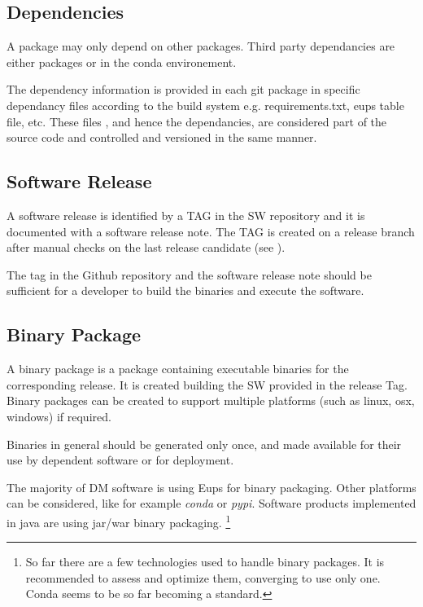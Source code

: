 \subsection{Dependencies} \label{sec:dependencies}


A package may only depend on other packages. Third party dependancies are either packages or in the conda environement.

The dependency information is provided in each git package in specific dependancy files  according to the build system e.g.  requirements.txt, eups table file, etc.
These files , and hence the dependancies,  are considered part of the source code and controlled  and versioned in the same manner.


\subsection{Software Release} \label{sec:swrel}

A software release is identified by a TAG in the SW repository and it is documented with a software release note.
The TAG is created on a release branch after manual checks on the last release candidate (see ).

The tag in the Github repository and the software release note should be sufficient for a developer
to build the binaries and execute the software.



\subsection{Binary Package} \label{sec:swbpkg}

A binary package is a package containing executable binaries for the corresponding release.
It is created building the SW provided in the release Tag.
Binary packages can be created to support multiple platforms (such as linux, osx, windows) if required.

Binaries in general should be generated only once, and made available for their use by dependent software or for deployment.

The majority of DM software is using Eups for binary packaging. Other platforms can be considered, like for example \textit{conda} or \textit{pypi}.
Software products implemented in java are using jar/war binary packaging.
\footnote{So far there are a few technologies used to handle binary packages. It is recommended to assess and optimize them, converging to use only one.
Conda seems to be so far becoming a standard.}

